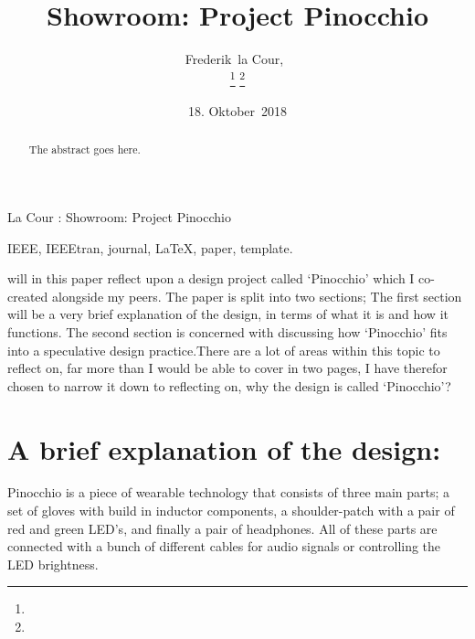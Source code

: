 \documentclass[journal]{IEEEtran}
\begin{document}
\title{Showroom: Project Pinocchio}

\author{Frederik~la Cour,~
\date{18. Oktober~2018}
\thanks{}
\thanks{}}

%
%
{La Cour \MakeLowercase{\textit{}}: Showroom: Project Pinocchio}

\begin{abstract}
The abstract goes here.
\end{abstract}


\begin{IEEEkeywords}
IEEE, IEEEtran, journal, \LaTeX, paper, template.
\end{IEEEkeywords}






%
\IEEEpeerreviewmaketitle



 will in this paper reflect upon a design project called ‘Pinocchio’ which I co-created alongside my peers. The paper is split into two sections; The first section will be a very brief explanation of the design, in terms of what it is and how it functions. The second section is concerned with discussing how ‘Pinocchio’ fits into a speculative design practice.There are a lot of areas within this topic to reflect on, far more than I would be able to cover in two pages, I have therefor chosen to narrow it down to reflecting on, why the design is called ‘Pinocchio’?

\section{A brief explanation of the design:}
Pinocchio is a piece of wearable technology that consists of three main parts; a set of gloves with build in inductor components, a shoulder-patch with a pair of red and green LED’s, and finally a pair of headphones. All of these parts are connected with a bunch of different cables for audio signals or controlling the LED brightness.
\end{document}
